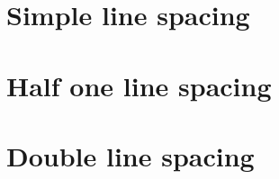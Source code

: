 \documentclass{article}
\begin{document}
\section{Simple line spacing}

\lipsum[1]

\section{Half one line spacing}

\begin{onehalfspacing}
\lipsum[2]
\end{onehalfspacing}

\section{Double line spacing}

\begin{doublespacing}
\lipsum[3]
\end{doublespacing}
	
\end{document}

